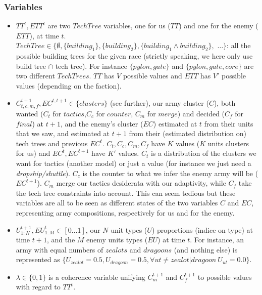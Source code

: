 \subsubsection{Variables}
\begin{itemize}
    \item $TT^t, ETT^t$ are two $TechTree$ variables, one for us ($TT$) and one for the enemy ($ETT$), at time $t$. $TechTree \in \{\emptyset, \{building_1\}, \{building_2\}, \{building_1\wedge building_2\},$ $\dots\}$: all the possible building trees for the given race (strictly speaking, we here only use build tree $\cap$ tech tree). For instance $\{pylon, gate\}$ and $\{pylon, gate, core\}$ are two different $TechTrees$. $TT$ has $V$ possible values and $ETT$ has $V'$ possible values (depending on the faction).
    \item $C_{t,c,m,f}^{t+1}, EC^{t,t+1} \in \{clusters\}$ (see further), our army cluster ($C$), both wanted ($C_{t}$ for $tactics$,$C_{c}$ for $counter$, $C_{m}$ for $merge$) and decided ($C_{f}$ for $final$) at $t+1$, and the enemy's cluster ($EC$) estimated at $t$ from their units that we saw, and estimated at $t+1$ from their (estimated distribution on) tech trees and previous $EC^t$. $C_{t},C_{c},C_{m},C_{f}$ have $K$ values ($K$ units clusters for us) and $EC^t, EC^{t+1}$ have $K'$ values. $C_t$ is a distribution of the clusters we want for tactics (another model) or just a value (for instance we just need a \textit{dropship/shuttle}). $C_c$ is the counter to what we infer the enemy army will be ($EC^{t+1}$). $C_m$ merge our tactics desiderata with our adaptivity, while $C_f$ take the tech tree constraints into account. This can seem tedious but these variables are all to be seen as different states of the two variables $C$ and $EC$, representing army compositions, respectively for us and for the enemy.
    \item $U_{1:N}^{t+1}, EU_{1:M}^t \in [0\dots 1]$, our $N$ unit types ($U$) proportions (indice on type) at time $t+1$, and the $M$ enemy units types ($EU$) at time $t$. For instance, an army with equal numbers of $zealots$ and $dragoons$ (and nothing else) is represented as $\{U_{zealot}=0.5, U_{dragoon}=0.5, \forall ut \neq zealot|dragoon\ U_{ut}=0.0\}$.
    \item $\lambda \in \{0, 1\}$ is a coherence variable unifying $C_{m}^{t+1}$ and $C_{f}^{t+1}$ to possible values with regard to $TT^t$.
\end{itemize}

